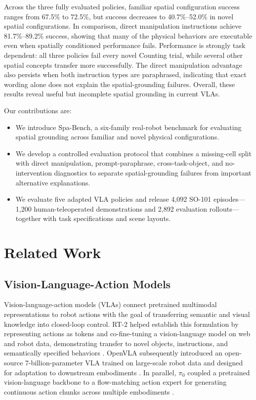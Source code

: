 \documentclass[conference]{IEEEtran}
\begin{document}
Across the three fully evaluated policies, familiar spatial configuration success ranges from 67.5\% to 72.5\%, but success decreases to 40.7\%--52.0\% in novel spatial configurations. In comparison, direct manipulation instructions achieve 81.7\%--89.2\% success, showing that many of the physical behaviors are executable even when spatially conditioned performance fails. Performance is strongly task dependent: all three policies fail every novel Counting trial, while several other spatial concepts transfer more successfully. The direct manipulation advantage also persists when both instruction types are paraphrased, indicating that exact wording alone does not explain the spatial-grounding failures. Overall, these results reveal useful but incomplete spatial grounding in current VLAs.

Our contributions are:

\begin{itemize}
    \item We introduce Spa-Bench, a six-family real-robot benchmark for evaluating spatial grounding across familiar and novel physical configurations.

    \item We develop a controlled evaluation protocol that combines a missing-cell split with direct manipulation, prompt-paraphrase, cross-task-object, and no-intervention diagnostics to separate spatial-grounding failures from important alternative explanations.

    \item We evaluate five adapted VLA policies and release 4,092 SO-101 episodes---1,200 human-teleoperated demonstrations and 2,892 evaluation rollouts---together with task specifications and scene layouts.
\end{itemize}

\section{Related Work}

\subsection{Vision-Language-Action Models}

Vision-language-action models (VLAs) connect pretrained multimodal representations to robot actions with the goal of transferring semantic and visual knowledge into closed-loop control. RT-2 helped establish this formulation by representing actions as tokens and co-fine-tuning a vision-language model on web and robot data, demonstrating transfer to novel objects, instructions, and semantically specified behaviors \cite{brohan2023rt2}. OpenVLA subsequently introduced an open-source 7-billion-parameter VLA trained on large-scale robot data and designed for adaptation to downstream embodiments \cite{kim2024openvla}. In parallel, $\pi_0$ coupled a pretrained vision-language backbone to a flow-matching action expert for generating continuous action chunks across multiple embodiments \cite{black2024pi0}.
\end{document}
